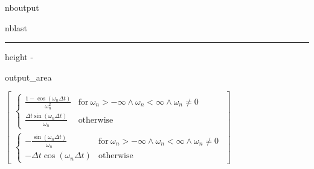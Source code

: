 \documentclass[letterpaper,10pt,english]{sphinxmanual}
\begin{document}
\begin{sphinxuseclass}{nboutput}
\begin{sphinxuseclass}{nblast}
\hrule height -\fboxrule\relax
\vspace{\nbsphinxcodecellspacing}

\savebox\nbsphinxpromptbox[0pt][r]{\color{nbsphinxout}\Verb|\strut{[32]:}\,|}

\begin{nbsphinxfancyoutput}

\begin{sphinxuseclass}{output_area}
\begin{sphinxuseclass}{}$\displaystyle \left[\begin{matrix}\begin{cases} \frac{1 - \cos{\left(\omega_{n} {\Delta}t \right)}}{\omega_{n}^{2}} & \text{for}\: \omega_{n} > -\infty \wedge \omega_{n} < \infty \wedge \omega_{n} \neq 0 \\\frac{{\Delta}t \sin{\left(\omega_{n} {\Delta}t \right)}}{\omega_{n}} & \text{otherwise} \end{cases}\\\begin{cases} - \frac{\sin{\left(\omega_{n} {\Delta}t \right)}}{\omega_{n}} & \text{for}\: \omega_{n} > -\infty \wedge \omega_{n} < \infty \wedge \omega_{n} \neq 0 \\- {\Delta}t \cos{\left(\omega_{n} {\Delta}t \right)} & \text{otherwise} \end{cases}\end{matrix}\right]$
\end{sphinxuseclass}
\end{sphinxuseclass}
\end{nbsphinxfancyoutput}

\end{sphinxuseclass}
\end{sphinxuseclass}
\sphinxstepscope
\end{document}
